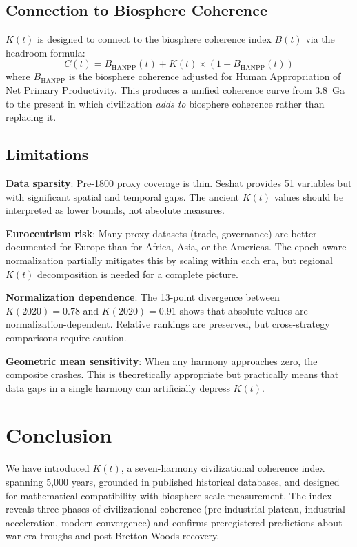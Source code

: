 \documentclass[10pt,letterpaper]{article}
\newcommand{\kt}{$K(t)$}
\begin{document}
\subsection*{Connection to Biosphere Coherence}

\kt{} is designed to connect to the biosphere coherence index $B(t)$
\cite{stoltz2026bt} via the headroom formula:
\begin{equation}
C(t) = B_{\text{HANPP}}(t) + K(t) \times (1 - B_{\text{HANPP}}(t))
\end{equation}
where $B_{\text{HANPP}}$ is the biosphere coherence adjusted for Human
Appropriation of Net Primary Productivity. This produces a unified
coherence curve from 3.8~Ga to the present in which civilization
\emph{adds to} biosphere coherence rather than replacing it.

\subsection*{Limitations}

\textbf{Data sparsity}: Pre-1800 proxy coverage is thin. Seshat provides
51 variables but with significant spatial and temporal gaps. The ancient
\kt{} values should be interpreted as lower bounds, not absolute measures.

\textbf{Eurocentrism risk}: Many proxy datasets (trade, governance)
are better documented for Europe than for Africa, Asia, or the Americas.
The epoch-aware normalization partially mitigates this by scaling within
each era, but regional \kt{} decomposition is needed for a complete
picture.

\textbf{Normalization dependence}: The 13-point divergence between
$K(2020) = 0.78$ and $K(2020) = 0.91$ shows that absolute values are
normalization-dependent. Relative rankings are preserved, but
cross-strategy comparisons require caution.

\textbf{Geometric mean sensitivity}: When any harmony approaches zero,
the composite crashes. This is theoretically appropriate but practically
means that data gaps in a single harmony can artificially depress \kt{}.

\section*{Conclusion}

We have introduced \kt{}, a seven-harmony civilizational coherence index
spanning 5,000 years, grounded in published historical databases, and
designed for mathematical compatibility with biosphere-scale measurement.
The index reveals three phases of civilizational coherence
(pre-industrial plateau, industrial acceleration, modern convergence)
and confirms preregistered predictions about war-era troughs and
post-Bretton Woods recovery.
\end{document}
